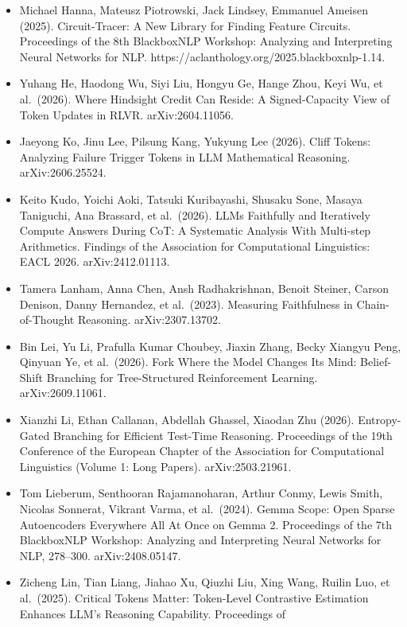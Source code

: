 \documentclass[
  10pt,
  a4paper,
]{article}
\begin{document}
\begin{itemize}
  Gemma Team, Morgane Riviere, Shreya Pathak, Pier Giuseppe Sessa, Cassidy Hardin, Surya Bhupatiraju, et al.~(2024). Gemma 2: Improving Open Language Models at a Practical Size. arXiv:2408.00118.
\item
  Michael Hanna, Mateusz Piotrowski, Jack Lindsey, Emmanuel Ameisen (2025). Circuit-Tracer: A New Library for Finding Feature Circuits. Proceedings of the 8th BlackboxNLP Workshop: Analyzing and
  Interpreting Neural Networks for NLP. https://aclanthology.org/2025.blackboxnlp-1.14.
\item
  Yuhang He, Haodong Wu, Siyi Liu, Hongyu Ge, Hange Zhou, Keyi Wu, et al.~(2026). Where Hindsight Credit Can Reside: A Signed-Capacity View of Token Updates in RLVR. arXiv:2604.11056.
\item
  Jaeyong Ko, Jinu Lee, Pilsung Kang, Yukyung Lee (2026). Cliff Tokens: Analyzing Failure Trigger Tokens in LLM Mathematical Reasoning. arXiv:2606.25524.
\item
  Keito Kudo, Yoichi Aoki, Tatsuki Kuribayashi, Shusaku Sone, Masaya Taniguchi, Ana Brassard, et al.~(2026). LLMs Faithfully and Iteratively Compute Answers During CoT: A Systematic Analysis With
  Multi-step Arithmetics. Findings of the Association for Computational Linguistics: EACL 2026. arXiv:2412.01113.
\item
  Tamera Lanham, Anna Chen, Ansh Radhakrishnan, Benoit Steiner, Carson Denison, Danny Hernandez, et al.~(2023). Measuring Faithfulness in Chain-of-Thought Reasoning. arXiv:2307.13702.
\item
  Bin Lei, Yu Li, Prafulla Kumar Choubey, Jiaxin Zhang, Becky Xiangyu Peng, Qinyuan Ye, et al.~(2026). Fork Where the Model Changes Its Mind: Belief-Shift Branching for Tree-Structured Reinforcement
  Learning. arXiv:2609.11061.
\item
  Xianzhi Li, Ethan Callanan, Abdellah Ghassel, Xiaodan Zhu (2026). Entropy-Gated Branching for Efficient Test-Time Reasoning. Proceedings of the 19th Conference of the European Chapter of the
  Association for Computational Linguistics (Volume 1: Long Papers). arXiv:2503.21961.
\item
  Tom Lieberum, Senthooran Rajamanoharan, Arthur Conmy, Lewis Smith, Nicolas Sonnerat, Vikrant Varma, et al.~(2024). Gemma Scope: Open Sparse Autoencoders Everywhere All At Once on Gemma 2.
  Proceedings of the 7th BlackboxNLP Workshop: Analyzing and Interpreting Neural Networks for NLP, 278--300. arXiv:2408.05147.
\item
  Zicheng Lin, Tian Liang, Jiahao Xu, Qiuzhi Liu, Xing Wang, Ruilin Luo, et al.~(2025). Critical Tokens Matter: Token-Level Contrastive Estimation Enhances LLM's Reasoning Capability. Proceedings of

\end{itemize}
\end{document}
